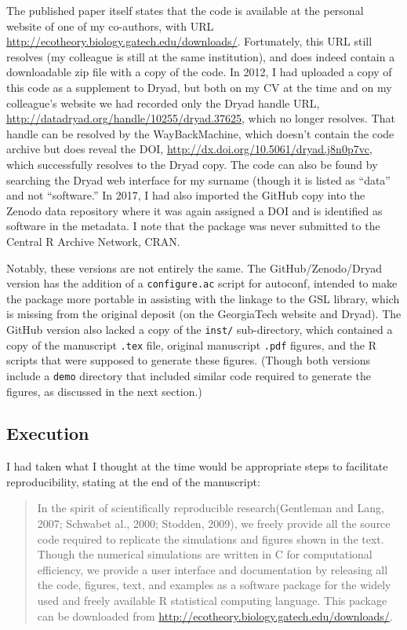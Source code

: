 \documentclass[
]{rescience}
\begin{document}
The published paper itself states that the code is available at the
personal website of one of my co-authors, with URL
\url{http://ecotheory.biology.gatech.edu/downloads/}. Fortunately, this
URL still resolves (my colleague is still at the same institution), and
does indeed contain a downloadable zip file with a copy of the code. In
2012, I had uploaded a copy of this code as a supplement to Dryad, but
both on my CV at the time and on my colleague's website we had recorded
only the Dryad handle URL,
\url{http://datadryad.org/handle/10255/dryad.37625}, which no longer
resolves. That handle can be resolved by the WayBackMachine, which
doesn't contain the code archive but does reveal the DOI,
\url{http://dx.doi.org/10.5061/dryad.j8n0p7vc}, which successfully
resolves to the Dryad copy. The code can also be found by searching the
Dryad web interface for my surname (though it is listed as ``data'' and
not ``software.'' In 2017, I had also imported the GitHub copy into the
Zenodo data repository where it was again assigned a DOI and is
identified as software in the metadata. I note that the package was
never submitted to the Central R Archive Network, CRAN.

Notably, these versions are not entirely the same. The
GitHub/Zenodo/Dryad version has the addition of a \texttt{configure.ac}
script for autoconf, intended to make the package more portable in
assisting with the linkage to the GSL library, which is missing from the
original deposit (on the GeorgiaTech website and Dryad). The GitHub
version also lacked a copy of the \texttt{inst/} sub-directory, which
contained a copy of the manuscript \texttt{.tex} file, original
manuscript \texttt{.pdf} figures, and the R scripts that were supposed
to generate these figures. (Though both versions include a \texttt{demo}
directory that included similar code required to generate the figures,
as discussed in the next section.)

\hypertarget{execution}{%
\subsection{Execution}\label{execution}}

I had taken what I thought at the time would be appropriate steps to
facilitate reproducibility, stating at the end of the manuscript:

\begin{quote}
In the spirit of scientifically reproducible research(Gentleman and
Lang, 2007; Schwabet al., 2000; Stodden, 2009), we freely provide all
the source code required to replicate the simulations and figures shown
in the text. Though the numerical simulations are written in C for
computational efficiency, we provide a user interface and documentation
by releasing all the code, figures, text, and examples as a software
package for the widely used and freely available R statistical computing
language. This package can be downloaded from
\url{http://ecotheory.biology.gatech.edu/downloads/}.
\end{quote}
\end{document}
